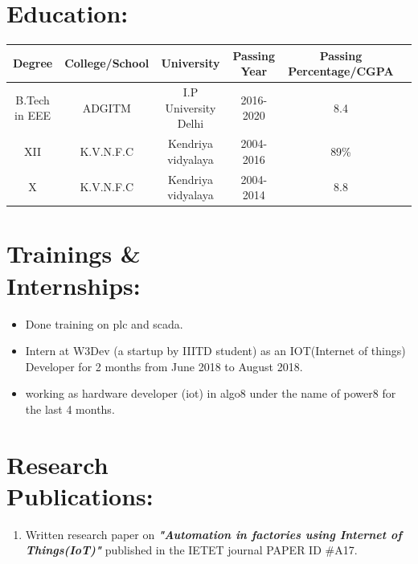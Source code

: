 \documentclass[10pt]{report}
\begin{document}
\section*{Education:} %
\begin{center}
\begin{tabular}{|c|c|c|c|c|c|}
	\hline
	\hspace{2pt}\large\textbf{Degree} \hspace{2pt} & \hspace{2pt}\large\textbf{College/School}\hspace{2pt} &\hspace{2pt} \large\textbf{University}\hspace{2pt} &\hspace{2pt}\large\textbf{Passing Year}\hspace{2pt} & \hspace{2pt}\large\textbf{Passing Percentage/CGPA}\hspace{2pt}\\
	\hline
	 B.Tech in EEE & ADGITM & I.P University Delhi & 2016-2020 & 8.4 \\
	XII & K.V.N.F.C & Kendriya vidyalaya & 2004-2016 & 89\%\\
	X & K.V.N.F.C & Kendriya vidyalaya & 2004-2014 & 8.8\\ 
	\hline
\end{tabular}
\end{center}
\section*{Trainings \&\\ Internships:} %
\begin{itemize}
\item Done training on plc and scada.
\item Intern at W3Dev (a startup by IIITD student) as an IOT(Internet of things) Developer for 2 months from June 2018 to August 2018.
\item working as hardware developer (iot) in algo8 under the name of power8 for the last 4 months.
\end{itemize}

\section*{Research \\Publications:} %
\begin{enumerate}
	\item Written research paper on \textbf{\textit{"Automation in factories using Internet of Things(IoT)"}} published in the IETET journal   PAPER ID \#A17.
\end{enumerate}
\end{document}
